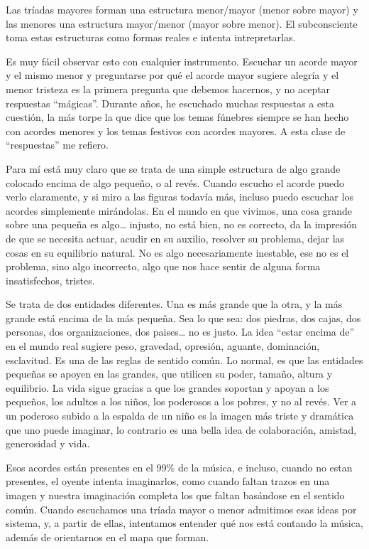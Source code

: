 \documentclass[]{article}
\begin{document}
Las tríadas mayores forman una estructura menor/mayor (menor sobre mayor) y las menores una estructura mayor/menor (mayor sobre menor). El subconsciente toma estas estructuras como formas reales e intenta intrepretarlas.

Es muy fácil observar esto con cualquier instrumento. Escuchar un acorde mayor y el mismo menor y preguntarse por qué el acorde mayor sugiere alegría y el menor tristeza es la primera pregunta que debemos hacernos, y no aceptar respuestas ``mágicas''. Durante años, he escuchado muchas respuestas a esta cuestión, la más torpe la que dice que los temas fúnebres siempre se han hecho con acordes menores y los temas festivos con acordes mayores. A esta clase de ``respuestas'' me refiero.

Para mí está muy claro que se trata de una simple estructura de algo grande colocado encima de algo pequeño, o al revés. Cuando escucho el acorde puedo verlo claramente, y si miro a las figuras todavía más, incluso puedo escuchar los acordes simplemente mirándolas. En el mundo en que vivimos, una cosa grande sobre una pequeña es algo\ldots{} injusto, no está bien, no es correcto, da la impresión de que se necesita actuar, acudir en su auxilio, resolver su problema, dejar las cosas en su equilibrio natural. No es algo necesariamente inestable, ese no es el problema, sino algo incorrecto, algo que nos hace sentir de alguna forma insatisfechos, tristes.

Se trata de dos entidades diferentes. Una es más grande que la otra, y la más grande está encima de la más pequeña. Sea lo que sea: dos piedras, dos cajas, dos personas, dos organizaciones, dos paises\ldots{} no es justo. La idea ``estar encima de'' en el mundo real sugiere peso, gravedad, opresión, aguante, dominación, esclavitud. Es una de las reglas de sentido común. Lo normal, es que las entidades pequeñas se apoyen en las grandes, que utilicen su poder, tamaño, altura y equilibrio. La vida sigue gracias a que los grandes soportan y apoyan a los pequeños, los adultos a los niños, los poderosos a los pobres, y no al revés. Ver a un poderoso subido a la espalda de un niño es la imagen más triste y dramática que uno puede imaginar, lo contrario es una bella idea de colaboración, amistad, generosidad y vida.

Esos acordes están presentes en el 99\% de la música, e incluso, cuando no estan presentes, el oyente intenta imaginarlos, como cuando faltan trazos en una imagen y nuestra imaginación completa los que faltan basándose en el sentido común. Cuando escuchamos una tríada mayor o menor admitimos esas ideas por sistema, y, a partir de ellas, intentamos entender qué nos está contando la música, además de orientarnos en el mapa que forman.
\end{document}

